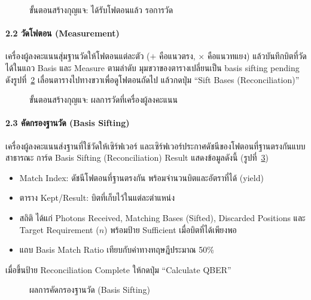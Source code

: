 \begin{figure}[htbp]
\centering
{}
\caption{ขั้นตอนสร้างกุญแจ: ได้รับโฟตอนแล้ว รอการวัด}
\label{fig:manual-keygen-pending}
\end{figure}

\paragraph{2.2 วัดโฟตอน (Measurement)}
เครื่องผู้ลงคะแนนสุ่มฐานวัดให้โฟตอนแต่ละตัว ($+$ คือแนวตรง, $\times$ คือแนวทแยง)
แล้วบันทึกบิตที่วัดได้ในแถว Basis และ Measure ตามลำดับ
มุมขวาของตารางเปลี่ยนเป็น basis sifting pending ดังรูปที่~\ref{fig:manual-keygen}
เลื่อนตารางไปทางขวาเพื่อดูโฟตอนถัดไป แล้วกดปุ่ม ``Sift Bases (Reconciliation)''

\begin{figure}[htbp]
\centering
{}
\caption{ขั้นตอนสร้างกุญแจ: ผลการวัดที่เครื่องผู้ลงคะแนน}
\label{fig:manual-keygen}
\end{figure}

\paragraph{2.3 คัดกรองฐานวัด (Basis Sifting)}
เครื่องผู้ลงคะแนนส่งฐานที่ใช้วัดให้เซิร์ฟเวอร์ และเซิร์ฟเวอร์ประกาศดัชนีของโฟตอนที่ฐานตรงกันแบบสาธารณะ
การ์ด Basis Sifting (Reconciliation) Result แสดงข้อมูลดังนี้ (รูปที่~\ref{fig:manual-sifting})
\begin{itemize}
  \item Match Index: ดัชนีโฟตอนที่ฐานตรงกัน พร้อมจำนวนบิตและอัตราที่ได้ (yield)
  \item ตาราง Kept/Result: บิตที่เก็บไว้ในแต่ละตำแหน่ง
  \item สถิติ ได้แก่ Photons Received, Matching Bases (Sifted), Discarded Positions และ
        Target Requirement ($n$) พร้อมป้าย Sufficient เมื่อบิตที่ได้เพียงพอ
  \item แถบ Basis Match Ratio เทียบกับค่าทางทฤษฎีประมาณ 50\%
\end{itemize}
เมื่อขึ้นป้าย Reconciliation Complete ให้กดปุ่ม ``Calculate QBER''

\begin{figure}[htbp]
\centering
{}
\caption{ผลการคัดกรองฐานวัด (Basis Sifting)}
\label{fig:manual-sifting}
\end{figure}

